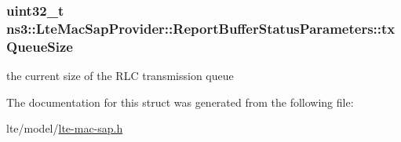 \subsubsection[{\texorpdfstring{tx\+Queue\+Size}{txQueueSize}}]{\setlength{\rightskip}{0pt plus 5cm}uint32\+\_\+t ns3\+::\+Lte\+Mac\+Sap\+Provider\+::\+Report\+Buffer\+Status\+Parameters\+::tx\+Queue\+Size}\hypertarget{structns3_1_1LteMacSapProvider_1_1ReportBufferStatusParameters_a02b02f85a2c185f81185c06c37359840}{}\label{structns3_1_1LteMacSapProvider_1_1ReportBufferStatusParameters_a02b02f85a2c185f81185c06c37359840}
the current size of the R\+LC transmission queue 

The documentation for this struct was generated from the following file\+:\begin{DoxyCompactItemize}
\item 
lte/model/\hyperlink{lte-mac-sap_8h}{lte-\/mac-\/sap.\+h}\end{DoxyCompactItemize}
